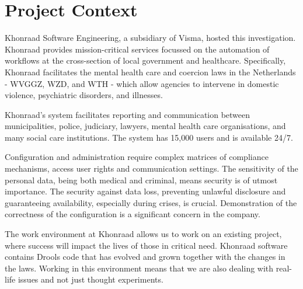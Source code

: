 \section{Project Context}
\label{section:problem_context}

Khonraad Software Engineering, a subsidiary of Visma, hosted this investigation.
Khonraad provides mission-critical services focussed on the automation of workflows at the cross-section of local government and healthcare.
Specifically, Khonraad facilitates the mental health care and coercion laws in the Netherlands - WVGGZ, WZD, and WTH - which allow agencies to intervene in domestic violence, psychiatric disorders, and illnesses.

Khonraad's system facilitates reporting and communication between municipalities, police, judiciary, lawyers, mental health care organisations, and many social care institutions.
The system has 15,000 users and is available 24/7.

Configuration and administration require complex matrices of compliance mechanisms, access user rights and communication settings.
The sensitivity of the personal data, being both medical and criminal, means security is of utmost importance.
The security against data loss, preventing unlawful disclosure and guaranteeing availability, especially during crises, is crucial.
Demonstration of the correctness of the configuration is a significant concern in the company.

The work environment at Khonraad allows us to work on an existing project, where success will impact the lives of those in critical need. 
Khonraad software contains Drools code that has evolved and grown together with the changes in the laws. 
Working in this environment means that we are also dealing with real-life issues and not just thought experiments.
